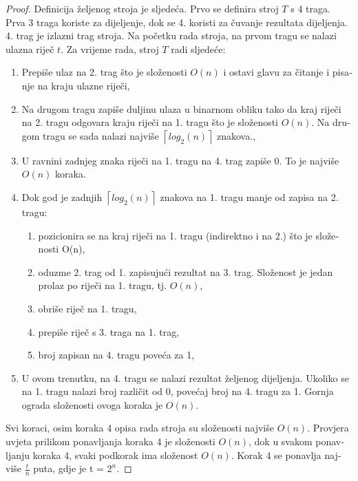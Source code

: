 \documentclass[12pt]{rectors}
\begin{document}
\begin{otherlanguage}{croatian}
\begin{proof}
Definicija željenog stroja je sljedeća.
Prvo se definira stroj $T$ s 4 traga.
Prva 3 traga koriste za dijeljenje, dok se 4. koristi za čuvanje rezultata dijeljenja. 4. trag je izlazni trag stroja. 
Na početku rada stroja, na prvom tragu se nalazi ulazna riječ $t$. \newline
Za vrijeme rada, stroj $T$ radi sljedeće:
\begin{enumerate}
    \item Prepiše ulaz na 2. trag što je složenosti $O(n)$ i ostavi glavu za čitanje i pisanje na kraju ulazne riječi,
    
    \item Na drugom tragu zapiše duljinu ulaza u binarnom obliku tako da kraj riječi na 2. tragu odgovara kraju riječi na 1. tragu što je složenosti $O(n)$.
    Na drugom tragu se sada nalazi
    najviše $\left \lceil{log_2(n)}\right \rceil$  znakova.,
    \item U ravnini zadnjeg znaka riječi na 1. tragu na 4. trag zapiše $0$. To je najviše $O(n)$ koraka.
    \item Dok god je zadnjih $\left \lceil{log_2(n)}\right \rceil$ znakova na 1. tragu manje od zapisa na 2. tragu:
    \begin{enumerate}
        \item pozicionira se na kraj riječi na 1. tragu (indirektno i na 2.) što je složenosti O(n),
        \item oduzme 2. trag od 1. zapisujući rezultat na 3. trag. Složenost je jedan prolaz po riječi na 1. tragu, tj. $O(n)$,
        \item obriše riječ na 1. tragu,
        \item prepiše riječ s 3. traga na 1. trag, 
        \item broj zapisan na 4. tragu poveća za 1, 
    \end{enumerate}
    \item U ovom trenutku, na 4. tragu se nalazi rezultat željenog dijeljenja. Ukoliko se na 1. tragu nalazi broj različit od 0, povećaj broj na 4. tragu za 1. Gornja ograda složenosti ovoga koraka je $O(n)$.
\end{enumerate}
Svi koraci, osim koraka 4 opisa rada stroja su složenosti najviše $O(n)$.
Provjera uvjeta prilikom ponavljanja koraka 4 je složenosti $O(n)$, dok
u svakom ponavljanju koraka 4, svaki podkorak ima složenost $O(n)$. Korak 4 se ponavlja
najviše $\frac{t}{n}$ puta, gdje je t = $2^n$. 


\end{proof}
\end{otherlanguage}
\end{document}

